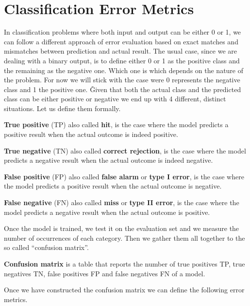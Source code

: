 \section{Classification Error Metrics}

In classification problems where both input and output can be either 0 or 1, we can follow a different approach of
error evaluation based on exact matches and mismatches between prediction and actual result. The usual case, since we
are dealing with a binary output, is to define either 0 or 1 as the positive class and the remaining as the negative
one. Which one is which depends on the nature of the problem. For now we will stick with the case were 0 represents
the negative class and 1 the positive one. \v

Given that both the actual class and the predicted class can be either positive or negative we end up with 4
different, distinct situations. Let us define them formally.

\textbf{True positive} (TP) also called \textbf{hit}, is the case where the model predicts a positive result when the
actual outcome is indeed positive.
\ed

\textbf{True negative} (TN) also called \textbf{correct rejection}, is the case where the model predicts a negative
result when the actual outcome is indeed negative.
\ed

\textbf{False positive} (FP) also called \textbf{false alarm} or \textbf{type I error}, is the case where the model
predicts a positive result when the actual outcome is negative.
\ed

\textbf{False negative} (FN) also called \textbf{miss} or \textbf{type II error}, is the case where the model
predicts a negative result when the actual outcome is positive.
\ed

Once the model is trained, we test it on the evaluation set and we measure the number of occurrences of each category.
Then we gather them all together to the so called ``confusion matrix''.

\textbf{Confusion matrix} is a table that reports the number of true positives TP, true negatives TN, false positives
FP and false negatives FN of a model.
\ed

\vspace{-5pt}


Once we have constructed the confusion matrix we can define the following error metrics.

